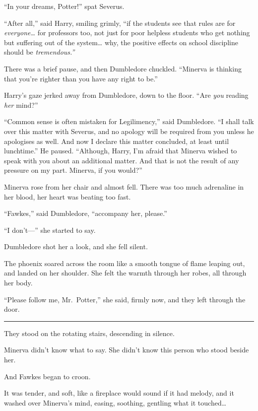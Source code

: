 ``In your dreams, Potter!'' spat Severus.

``After all,'' said Harry, smiling grimly, ``if the students see that
rules are for \emph{everyone\ldots{}} for professors too, not just for
poor helpless students who get nothing but suffering out of the
system\ldots{} why, the positive effects on school discipline should be
\emph{tremendous.''}

There was a brief pause, and then Dumbledore chuckled. ``Minerva is
thinking that you're righter than you have any right to be.''

Harry's gaze jerked away from Dumbledore, down to the floor. ``Are
\emph{you} reading \emph{her} mind?''

``Common sense is often mistaken for Legilimency,'' said Dumbledore. ``I
shall talk over this matter with Severus, and no apology will be
required from you unless he apologises as well. And now I declare this
matter concluded, at least until lunchtime.'' He paused. ``Although,
Harry, I'm afraid that Minerva wished to speak with you about an
additional matter. And that is not the result of any pressure on my
part. Minerva, if you would?''

Minerva rose from her chair and almost fell. There was too much
adrenaline in her blood, her heart was beating too fast.

``Fawkes,'' said Dumbledore, ``accompany her, please.''

``I don't---'' she started to say.

Dumbledore shot her a look, and she fell silent.

The phoenix soared across the room like a smooth tongue of flame leaping
out, and landed on her shoulder. She felt the warmth through her robes,
all through her body.

``Please follow me, Mr.~Potter,'' she said, firmly now, and they left
through the door.

\begin{center}\rule{3in}{0.4pt}\end{center}

They stood on the rotating stairs, descending in silence.

Minerva didn't know what to say. She didn't know this person who stood
beside her.

And Fawkes began to croon.

It was tender, and soft, like a fireplace would sound if it had melody,
and it washed over Minerva's mind, easing, soothing, gentling what it
touched\ldots{}

